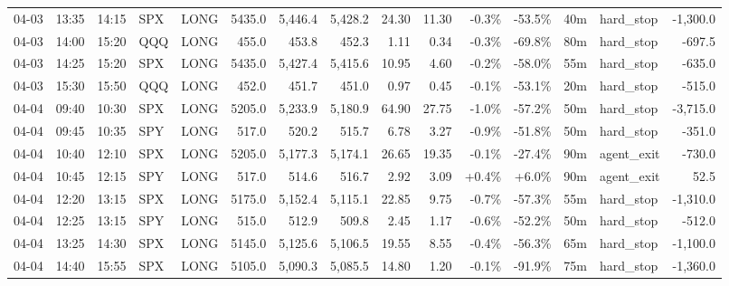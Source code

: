 \documentclass[11pt,a4paper,twoside]{article}
\begin{document}
\begin{landscape}
\begin{center}
\begin{longtable}{>{\color{txtmain}}l l l l l r r r r r r r r >{\color{txtmain}}l r}
04-03 & 13:35 & 14:15 & SPX & LONG & 5435.0 & 5,446.4 & 5,428.2 & 24.30 & 11.30 & \textcolor{lossred}{-0.3\%} & \textcolor{lossred}{-53.5\%} & 40m & hard\_stop & \textcolor{lossred}{-1,300.0} \\
04-03 & 14:00 & 15:20 & QQQ & LONG & 455.0 & 453.8 & 452.3 & 1.11 & 0.34 & \textcolor{lossred}{-0.3\%} & \textcolor{lossred}{-69.8\%} & 80m & hard\_stop & \textcolor{lossred}{-697.5} \\
04-03 & 14:25 & 15:20 & SPX & LONG & 5435.0 & 5,427.4 & 5,415.6 & 10.95 & 4.60 & \textcolor{lossred}{-0.2\%} & \textcolor{lossred}{-58.0\%} & 55m & hard\_stop & \textcolor{lossred}{-635.0} \\
04-03 & 15:30 & 15:50 & QQQ & LONG & 452.0 & 451.7 & 451.0 & 0.97 & 0.45 & \textcolor{lossred}{-0.1\%} & \textcolor{lossred}{-53.1\%} & 20m & hard\_stop & \textcolor{lossred}{-515.0} \\
04-04 & 09:40 & 10:30 & SPX & LONG & 5205.0 & 5,233.9 & 5,180.9 & 64.90 & 27.75 & \textcolor{lossred}{-1.0\%} & \textcolor{lossred}{-57.2\%} & 50m & hard\_stop & \textcolor{lossred}{-3,715.0} \\
04-04 & 09:45 & 10:35 & SPY & LONG & 517.0 & 520.2 & 515.7 & 6.78 & 3.27 & \textcolor{lossred}{-0.9\%} & \textcolor{lossred}{-51.8\%} & 50m & hard\_stop & \textcolor{lossred}{-351.0} \\
04-04 & 10:40 & 12:10 & SPX & LONG & 5205.0 & 5,177.3 & 5,174.1 & 26.65 & 19.35 & \textcolor{lossred}{-0.1\%} & \textcolor{lossred}{-27.4\%} & 90m & agent\_exit & \textcolor{lossred}{-730.0} \\
04-04 & 10:45 & 12:15 & SPY & LONG & 517.0 & 514.6 & 516.7 & 2.92 & 3.09 & \textcolor{wingreen}{+0.4\%} & \textcolor{wingreen}{+6.0\%} & 90m & agent\_exit & \textcolor{wingreen}{52.5} \\
04-04 & 12:20 & 13:15 & SPX & LONG & 5175.0 & 5,152.4 & 5,115.1 & 22.85 & 9.75 & \textcolor{lossred}{-0.7\%} & \textcolor{lossred}{-57.3\%} & 55m & hard\_stop & \textcolor{lossred}{-1,310.0} \\
04-04 & 12:25 & 13:15 & SPY & LONG & 515.0 & 512.9 & 509.8 & 2.45 & 1.17 & \textcolor{lossred}{-0.6\%} & \textcolor{lossred}{-52.2\%} & 50m & hard\_stop & \textcolor{lossred}{-512.0} \\
04-04 & 13:25 & 14:30 & SPX & LONG & 5145.0 & 5,125.6 & 5,106.5 & 19.55 & 8.55 & \textcolor{lossred}{-0.4\%} & \textcolor{lossred}{-56.3\%} & 65m & hard\_stop & \textcolor{lossred}{-1,100.0} \\
04-04 & 14:40 & 15:55 & SPX & LONG & 5105.0 & 5,090.3 & 5,085.5 & 14.80 & 1.20 & \textcolor{lossred}{-0.1\%} & \textcolor{lossred}{-91.9\%} & 75m & hard\_stop & \textcolor{lossred}{-1,360.0} \\

\end{longtable}
\end{center}
\end{landscape}
\end{document}

